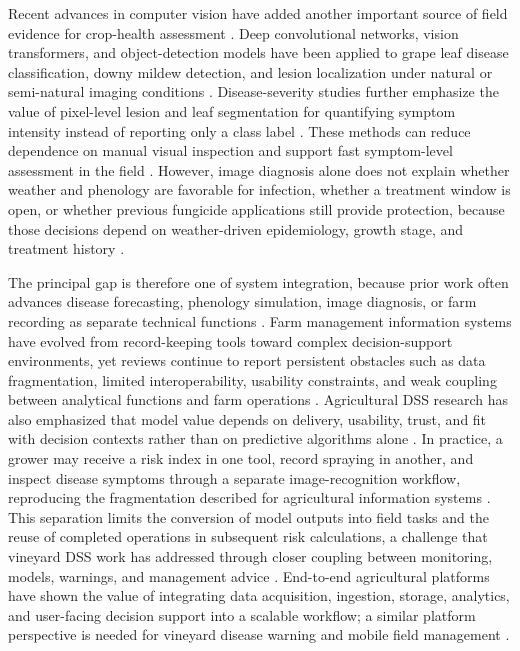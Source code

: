 \documentclass[11pt,a4paper]{article}
\begin{document}
Recent advances in computer vision have added another important source of field evidence for crop-health assessment \citep{Xie2020GrapeDetector,Liu2020GrapeLeafIdentification,Shi2023SeverityAssessment}. Deep convolutional networks, vision transformers, and object-detection models have been applied to grape leaf disease classification, downy mildew detection, and lesion localization under natural or semi-natural imaging conditions \citep{Zhang2022DownyMildewDetection,Kunduracioglu2024GrapeDeepLearning,Liu2024FusionTransformerYOLO}. Disease-severity studies further emphasize the value of pixel-level lesion and leaf segmentation for quantifying symptom intensity instead of reporting only a class label \citep{Shi2023SeverityAssessment}. These methods can reduce dependence on manual visual inspection and support fast symptom-level assessment in the field \citep{Xie2020GrapeDetector,Kunduracioglu2024GrapeDeepLearning}. However, image diagnosis alone does not explain whether weather and phenology are favorable for infection, whether a treatment window is open, or whether previous fungicide applications still provide protection, because those decisions depend on weather-driven epidemiology, growth stage, and treatment history \citep{Rossi2014ViteNet}.

The principal gap is therefore one of system integration, because prior work often advances disease forecasting, phenology simulation, image diagnosis, or farm recording as separate technical functions \citep{Fountas2015FMIS,Tummers2019FMISReview}. Farm management information systems have evolved from record-keeping tools toward complex decision-support environments, yet reviews continue to report persistent obstacles such as data fragmentation, limited interoperability, usability constraints, and weak coupling between analytical functions and farm operations \citep{Fountas2015FMIS,Tummers2019FMISReview}. Agricultural DSS research has also emphasized that model value depends on delivery, usability, trust, and fit with decision contexts rather than on predictive algorithms alone \citep{McCown2002DSSComplexity,Rose2016DecisionSupportTools}. In practice, a grower may receive a risk index in one tool, record spraying in another, and inspect disease symptoms through a separate image-recognition workflow, reproducing the fragmentation described for agricultural information systems \citep{Tummers2019FMISReview}. This separation limits the conversion of model outputs into field tasks and the reuse of completed operations in subsequent risk calculations, a challenge that vineyard DSS work has addressed through closer coupling between monitoring, models, warnings, and management advice \citep{Rossi2014ViteNet,Mian2021DownyMildewDSS}. End-to-end agricultural platforms have shown the value of integrating data acquisition, ingestion, storage, analytics, and user-facing decision support into a scalable workflow; a similar platform perspective is needed for vineyard disease warning and mobile field management \citep{Bakir2026PrecisionRanchingPlatform,Fountas2015FMIS}.
\end{document}
